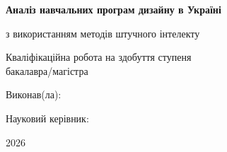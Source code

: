 \begin{titlepage}
\begin{center}

{\large }

\vspace{3cm}

{\LARGE \textbf{Аналіз навчальних програм дизайну в Україні}}

\vspace{0.5cm}

{\large з використанням методів штучного інтелекту}

\vspace{2cm}

Кваліфікаційна робота на здобуття ступеня\\
бакалавра/магістра

\vspace{2cm}

Виконав(ла): 

\vspace{0.5cm}

Науковий керівник: 

\vfill

2026

\end{center}
\end{titlepage}
\newpage
